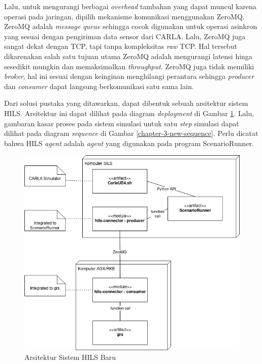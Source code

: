 Lalu, untuk mengurangi berbagai \textit{overhead} tambahan yang dapat muncul
karena operasi pada jaringan, dipilih mekanisme komunikasi menggunakan ZeroMQ.
ZeroMQ adalah \textit{message queue} sehingga cocok digunakan untuk operasi
asinkron yang sesuai dengan pengiriman data sensor dari CARLA. Lalu, ZeroMQ juga
sangat dekat dengan TCP, tapi tanpa kompleksitas \textit{raw} TCP. Hal tersebut
dikarenakan salah satu tujuan utama ZeroMQ adalah mengurangi latensi hinga
sesedikit mungkin dan memaksimalkan \textit{throughput}. ZeroMQ juga tidak
memiliki \textit{broker}, hal ini sesuai dengan keinginan menghilangi perantara
sehingga \textit{producer} dan \textit{consumer} dapat langsung berkomunikasi
satu sama lain.

Dari solusi pustaka yang ditawarkan, dapat dibentuk sebuah arsitektur sistem
HILS. Arsitektur ini dapat dilihat pada diagram \textit{deployment} di Gambar
\ref{chapter-3-new-architecture}. Lalu, gambaran kasar proses pada sistem
simulasi untuk satu \textit{step} simulasi dapat dilihat pada diagram
\textit{sequence} di Gambar \ref{chapter-3-new-sequence}. Perlu dicatat bahwa
HILS \textit{agent} adalah \textit{agent} yang digunakan pada program
ScenarioRunner.

\begin{figure}[h!]
	\centering
	\includegraphics[width=1.0\textwidth]{resources/chapter-3/deployment-diagram-new-hils.png}
	\caption{Arsitektur Sistem HILS Baru}
	\label{chapter-3-new-architecture}
\end{figure}

